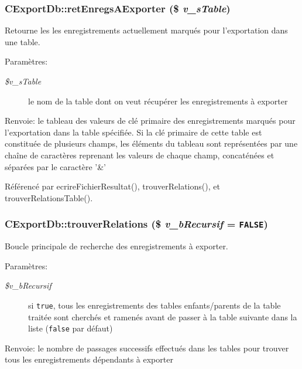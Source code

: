 \subsubsection{\setlength{\rightskip}{0pt plus 5cm}CExportDb::retEnregsAExporter (\$ {\em v\_\-sTable})}\label{class_c_export_db_7934adfee7e7bd75e7298c9201a4c5f5}


Retourne les les enregistrements actuellement marqués pour l'exportation dans une table. 

\begin{Desc}
\item[Paramètres:]
\begin{description}
\item[{\em \$v\_\-sTable}]le nom de la table dont on veut récupérer les enregistrements à exporter\end{description}
\end{Desc}
\begin{Desc}
\item[Renvoie:]le tableau des valeurs de clé primaire des enregistrements marqués pour l'exportation dans la table spécifiée. Si la clé primaire de cette table est constituée de plusieurs champs, les éléments du tableau sont représentées par une chaîne de caractères reprenant les valeurs de chaque champ, concaténées et séparées par le caractère '\&' \end{Desc}


Référencé par ecrireFichierResultat(), trouverRelations(), et trouverRelationsTable().
\subsubsection{\setlength{\rightskip}{0pt plus 5cm}CExportDb::trouverRelations (\$ {\em v\_\-bRecursif} = {\tt FALSE})}\label{class_c_export_db_78281e40eb72299ae23ab802521ac7e0}


Boucle principale de recherche des enregistrements à exporter. 

\begin{Desc}
\item[Paramètres:]
\begin{description}
\item[{\em \$v\_\-bRecursif}]si {\tt true}, tous les enregistrements des tables enfants/parents de la table traitée sont cherchés et ramenés avant de passer à la table suivante dans la liste ({\tt false} par défaut)\end{description}
\end{Desc}
\begin{Desc}
\item[Renvoie:]le nombre de passages successifs effectués dans les tables pour trouver tous les enregistrements dépendants à exporter \end{Desc}


